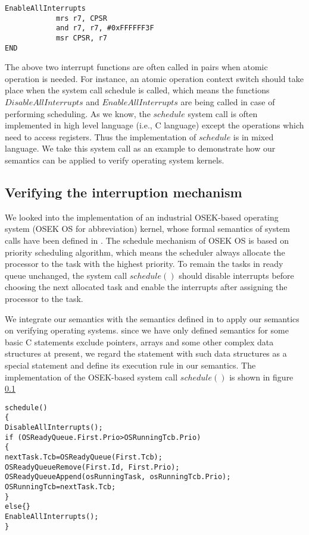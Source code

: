 \documentclass[letterpaper, 10 pt, conference]{IEEEtran}
\begin{document}
\begin{lstlisting}[xleftmargin=1em]
EnableAllInterrupts																		
			mrs r7, CPSR								
			and r7, r7, #0xFFFFFF3F			
			msr CPSR, r7							
END									
\end{lstlisting}
\vspace{11pt}
\par The above two interrupt functions are often called in pairs when atomic operation is needed. For instance, an atomic operation context switch should take place when the system call schedule is called, which means the functions $DisableAllInterrupts$ and $EnableAllInterrupts$ are being called in case of performing scheduling. As we know, the $schedule$ system call is often implemented in high level language (i.e., C language) except the operations which need to access registers. Thus the implementation of $schedule$ is in mixed language. We take this system call as an example to demonstrate how our semantics can be applied to verify operating system kernels.
\subsection{Verifying the interruption mechanism}
\par We looked into the implementation of an industrial OSEK-based operating system (OSEK OS for abbreviation) kernel, whose formal semantics of system calls have been defined in \cite{}. The schedule mechanism of OSEK OS is based on priority scheduling algorithm, which means the scheduler always allocate the processor to the task with the highest priority. To remain the tasks in ready queue unchanged, the system call $schedule()$ should disable interrupts before choosing the next allocated task and enable the interrupts after assigning the processor to the task.
\par We integrate our semantics with the semantics defined in \cite{} to apply our semantics on verifying operating systems. since we have only defined semantics for some basic C statements exclude pointers, arrays and some other complex data structures at present, we regard the statement with such data structures as a special statement and define its execution rule in our semantics. The implementation of the OSEK-based system call $schedule()$ is shown in figure \ref{}
\vspace{11pt}
\begin{lstlisting}[xleftmargin=1em]
schedule()
{
DisableAllInterrupts();
if (OSReadyQueue.First.Prio>OSRunningTcb.Prio)
{
nextTask.Tcb=OSReadyQueue(First.Tcb);
OSReadyQueueRemove(First.Id, First.Prio);
OSReadyQueueAppend(osRunningTask, osRunningTcb.Prio);
OSRunningTcb=nextTask.Tcb;
}
else{}
EnableAllInterrupts();
}
\end{lstlisting}
\vspace{11pt}	
\end{document}
